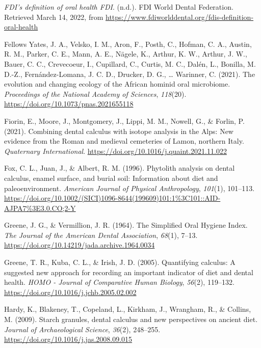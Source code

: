 \documentclass[
  letterpaper,
]{book}
\newlength{\cslhangindent}
\newlength{\cslentryspacingunit} %
\newenvironment{CSLReferences}[2] %
 {%
  \setlength{\parindent}{0pt}
  \ifodd #1
  \let\oldpar\par
  \def\par{\hangindent=\cslhangindent\oldpar}
  \fi
  \setlength{\parskip}{#2\cslentryspacingunit}
 }%
 {}
\begin{document}
\begin{CSLReferences}{1}{0}
\leavevmode{}%
\emph{{FDI}'s definition of oral health \textbar{} {FDI}}. (n.d.). {FDI
World Dental Federation}. Retrieved March 14, 2022, from
\url{https://www.fdiworlddental.org/fdis-definition-oral-health}

\leavevmode{}%
Fellows Yates, J. A., Velsko, I. M., Aron, F., Posth, C., Hofman, C. A.,
Austin, R. M., Parker, C. E., Mann, A. E., Nägele, K., Arthur, K. W.,
Arthur, J. W., Bauer, C. C., Crevecoeur, I., Cupillard, C., Curtis, M.
C., Dalén, L., Bonilla, M. D.-Z., Fernández-Lomana, J. C. D., Drucker,
D. G., \ldots{} Warinner, C. (2021). The evolution and changing ecology
of the {African} hominid oral microbiome. \emph{Proceedings of the
National Academy of Sciences}, \emph{118}(20).
\url{https://doi.org/10.1073/pnas.2021655118}

\leavevmode{}%
Fiorin, E., Moore, J., Montgomery, J., Lippi, M. M., Nowell, G., \&
Forlin, P. (2021). Combining dental calculus with isotope analysis in
the {Alps}: {New} evidence from the {Roman} and medieval cemeteries of
{Lamon}, northern {Italy}. \emph{Quaternary International}.
\url{https://doi.org/10.1016/j.quaint.2021.11.022}

\leavevmode{}%
Fox, C. L., Juan, J., \& Albert, R. M. (1996). Phytolith analysis on
dental calculus, enamel surface, and burial soil: {Information} about
diet and paleoenvironment. \emph{American Journal of Physical
Anthropology}, \emph{101}(1), 101--113.
\url{https://doi.org/10.1002/(SICI)1096-8644(199609)101:1\%3C101::AID-AJPA7\%3E3.0.CO;2-Y}

\leavevmode{}%
Greene, J. G., \& Vermillion, J. R. (1964). The {Simplified Oral Hygiene
Index}. \emph{The Journal of the American Dental Association},
\emph{68}(1), 7--13.
\url{https://doi.org/10.14219/jada.archive.1964.0034}

\leavevmode{}%
Greene, T. R., Kuba, C. L., \& Irish, J. D. (2005). Quantifying
calculus: {A} suggested new approach for recording an important
indicator of diet and dental health. \emph{HOMO - Journal of Comparative
Human Biology}, \emph{56}(2), 119--132.
\url{https://doi.org/10.1016/j.jchb.2005.02.002}

\leavevmode{}%
Hardy, K., Blakeney, T., Copeland, L., Kirkham, J., Wrangham, R., \&
Collins, M. (2009). Starch granules, dental calculus and new
perspectives on ancient diet. \emph{Journal of Archaeological Science},
\emph{36}(2), 248--255. \url{https://doi.org/10.1016/j.jas.2008.09.015}


\end{CSLReferences}
\end{document}
